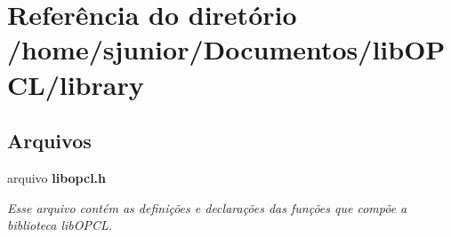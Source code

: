 \section{Referência do diretório /home/sjunior/\+Documentos/lib\+O\+P\+C\+L/library}
\label{dir_e3d620c6b6fdb93ed3bc6186215bde2e}
\subsection*{Arquivos}
\begin{DoxyCompactItemize}
\item 
arquivo \textbf{ libopcl.\+h}
\begin{DoxyCompactList}\small\item\em Esse arquivo contém as definições e declarações das funções que compõe a biblioteca lib\+O\+P\+CL. \end{DoxyCompactList}\end{DoxyCompactItemize}
